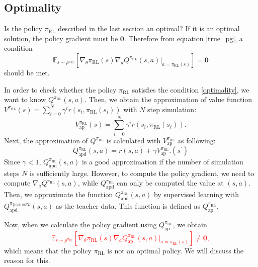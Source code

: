 \documentclass[english, dvipdfmx]{ampmt}             %
\newcommand{\unc}[1]{\textcolor{red}{#1}} %
\newcommand{\expect}{\mathbb{E}}
\begin{document}
\subsection{Optimality}
Is the policy $\pi_{\textrm{RL}}$ described in the last section an optimal? If it is an optimal solution, the policy gradient must be $\bm{0}$. Therefore from equation \eqref{true_pg}, a condition
\begin{equation}
	\expect_{s\sim\rho^{\pi_{\textrm{RL}}}}[
	\nabla_{\theta}\pi_{\textrm{RL}}(s)\nabla_{a}Q^{\pi_{\textrm{RL}}}(s, a)|_{a=\pi_{\textrm{RL}}(s)}] = \bm{0} \label{optimality}
\end{equation}
should be met. \par
In order to check whether the policy $\pi_{\textrm{RL}}$ satisfies the condition \eqref{optimality}, we want to know $Q^{\pi_{\textrm{RL}}}(s,a)$. Then, we obtain the approximation of value function $V^{\pi_{\textrm{RL}}}(s) = \sum_{i=0}^{N}\gamma^i r(s_i,\pi_{\textrm{RL}}(s_i))$ with $N$ step simulation:
\begin{equation}
	V^{\pi_{\textrm{RL}}}_{\textrm{ap}}(s) = \sum_{i=0}^{N}\gamma^i r(s_i,\pi_{\textrm{RL}}(s_i)).
\end{equation}
Next, the approximation of $Q^{\pi_{\textrm{RL}}}$ is calculated with $V^{\pi_{\textrm{RL}}}_{\textrm{ap}}$ as following:
\begin{equation}
	Q^{\pi_{\textrm{RL}}}_{\textrm{apd}}(s,a) = r(s,a) + \gamma V^{\pi_{\textrm{RL}}}_{\textrm{ap}}.(s^{\prime})
\end{equation}
Since $\gamma < 1$, $Q^{\pi_{\textrm{RL}}}_{\textrm{apd}}(s,a)$ is a good approximation if the number of simulation steps $N$ is sufficiently large. However, to compute the policy gradient, we need to compute $\nabla_{a}Q^{\pi_{\textrm{RL}}}(s, a)$, while $Q^{\pi_{\textrm{RL}}}_{\textrm{apd}}$ can only be computed the value at $(s,a)$. Then, we approximate the function $Q^{\pi_{\textrm{RL}}}_{\textrm{apd}}(s,a)$ by supervised learning with $Q^{\pi_{\{textrm{RL}}}_{\textrm{apd}}(s,a)$ as the teacher data. This function is defined as $Q^{\pi_{\textrm{RL}}}_{\textrm{ap}}$.\par
Now, when we calculate the policy gradient using $Q^{\pi_{\textrm{RL}}}_{\textrm{ap}}$, we obtain
\unc{
\begin{equation}
	\expect_{s\sim\rho^{\pi_{\textrm{RL}}}}[
	\nabla_{\theta}\pi_{\textrm{RL}}(s)\nabla_{a}Q^{\pi_{\textrm{RL}}}_{\textrm{ap}}(s, a)|_{a=\pi_{\textrm{RL}}(s)}] \neq \bm{0}, 
\end{equation}
}
which means that the policy $\pi_{\textrm{RL}}$ is not an optimal policy. We will discuss the reason for this.
\end{document}
